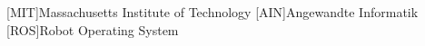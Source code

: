 
\begin{acronym}[ROS]
	[MIT]{Massachusetts Institute of Technology}
	[AIN]{Angewandte Informatik}
	[ROS]{Robot Operating System}
\end{acronym}
